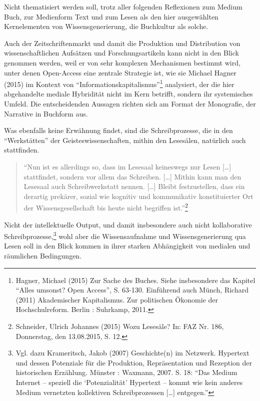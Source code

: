 \documentclass[a4paper,
fontsize=11pt,
oneside,
numbers=noperiodatend,
parskip=half-,
bibliography=totoc,
final
]{scrartcl}
\begin{document}
Nicht thematisiert werden soll, trotz aller folgenden Reflexionen zum
Medium Buch, zur Medienform Text und zum Lesen als den hier ausgewählten
Kernelementen von Wissensgenerierung, die Buchkultur als solche.

Auch der Zeitschriftenmarkt und damit die Produktion und Distribution
von wissenschaftlichen Aufsätzen und Forschungsartikeln kann nicht in
den Blick genommen werden, weil er von sehr komplexen Mechanismen
bestimmt wird, unter denen Open-Access eine zentrale Strategie ist, wie
sie Michael Hagner (2015) im Kontext von
\enquote{Informationskapitalismus}\footnote{Hagner, Michael (2015) Zur
  Sache des Buches. Siehe insbesondere das Kapitel \enquote{Alles
  umsonst? Open Access}, S. 63-130. Einführend auch Münch, Richard
  (2011) Akademischer Kapitalismus. Zur politischen Ökonomie der
  Hochschulreform. Berlin : Suhrkamp, 2011.} analysiert, der die hier
abgehandelte mediale Hybridität nicht im Kern betrifft, sondern ihr
systemisches Umfeld. Die entscheidenden Aussagen richten sich am Format
der Monografie, der Narrative in Buchform aus.

Was ebenfalls keine Erwähnung findet, sind die Schreibprozesse, die in
den \enquote{Werkstätten} der Geisteswissenschaften, mithin den
Lesesälen, natürlich auch stattfinden.

\begin{quote}
\enquote{Nun ist es allerdings so, dass im Lesesaal keineswegs nur Lesen
{[}\ldots{}{]} stattfindet, sondern vor allem das Schreiben.
{[}\ldots{}{]} Mithin kann man den Lesesaal auch Schreibwerkstatt
nennen. {[}\ldots{}{]} Bleibt festzustellen, dass ein derartig prekärer,
sozial wie kognitiv und kommunikativ konstituierter Ort der
Wissensgesellschaft bis heute nicht begriffen ist.}\footnote{Schneider,
  Ulrich Johannes (2015) Wozu Lesesäle? In: FAZ Nr. 186, Donnerstag, den
  13.08.2015, S. 12.}
\end{quote}

Nicht der intellektuelle Output, und damit insbesondere auch nicht
kollaborative Schreibprozesse,\footnote{Vgl. dazu Krameritsch, Jakob
  (2007) Geschichte(n) im Netzwerk. Hypertext und dessen Potenziale für
  die Produktion, Repräsentation und Rezeption der historischen
  Erzählung. Münster : Waxmann, 2007. S. 18: \enquote{Das Medium
  Internet -- speziell die \enquote{Potenzialität} Hypertext -- kommt
  wie kein anderes Medium vernetzten kollektiven Schreibprozessen
  {[}\ldots{}{]} entgegen.}} wohl aber die Wissensaufnahme und
Wissensgenerierung qua Lesen soll in den Blick kommen in ihrer starken
Abhängigkeit von medialen und räumlichen Bedingungen.
\end{document}

